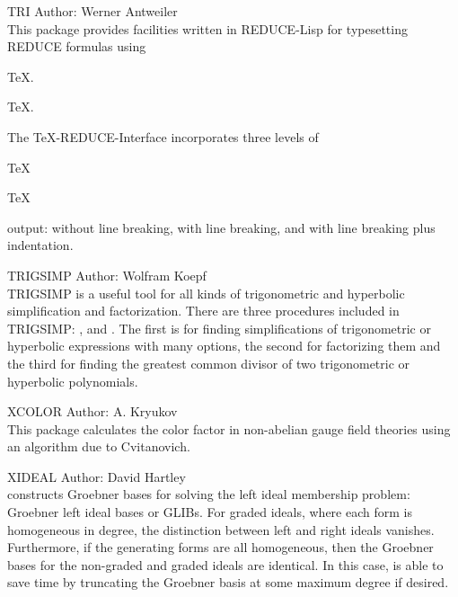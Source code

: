 \begin{Package}{TRI}
Author: Werner Antweiler\\

This package provides facilities written in REDUCE-Lisp for typesetting
REDUCE formulas
using \begin{TEX}\TeX. \end{TEX} \begin{INFO}TeX. \end{INFO} The
TeX-REDUCE-Interface incorporates three levels
of \begin{TEX}\TeX \end{TEX} \begin{INFO}TeX \end{INFO} output:
without line breaking, with line breaking, and
with line breaking plus indentation.
\end{Package}

\begin{Package}{TRIGSIMP}
Author: Wolfram Koepf\\
TRIGSIMP is a useful tool for all kinds of trigonometric and hyperbolic
simplification and factorization.  There are three procedures included in
TRIGSIMP: ,  and .  The
first is for finding simplifications of trigonometric or hyperbolic
expressions with many options, the second for factorizing them and the
third for finding the greatest common divisor of two trigonometric or
hyperbolic polynomials.
\end{Package}

\begin{Package}{XCOLOR}
Author: A. Kryukov\\

This package calculates the color factor in non-abelian gauge field
theories using an algorithm due to Cvitanovich.
\end{Package}

\begin{Package}{XIDEAL}
Author: David Hartley\\

 constructs Groebner bases for solving the left ideal
membership problem:  Groebner left ideal bases or GLIBs.  For graded
ideals, where each form is homogeneous in degree, the distinction between
left and right ideals vanishes.  Furthermore, if the generating forms are
all homogeneous, then the Groebner bases for the non-graded and graded
ideals are identical.  In this case,  is able to save time by
truncating the Groebner basis at some maximum degree if desired.
\end{Package}


